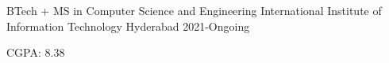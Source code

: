 
\begin{cventries}
  \cventry
    {BTech + MS in Computer Science and Engineering} %
    {International Institute of Information Technology} %
    {Hyderabad} %
    {2021-Ongoing} %
    {
      \begin{cvitems} %
        \item{CGPA: 8.38}
      \end{cvitems}
    }
\end{cventries}
